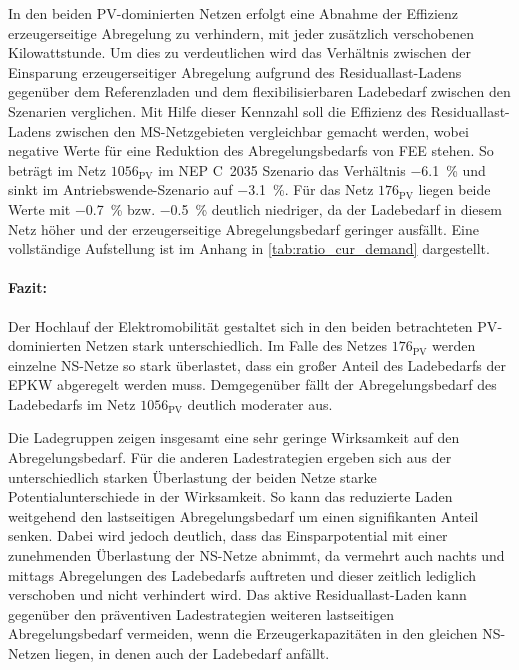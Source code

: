 

In den beiden \gls{PV}-dominierten Netzen erfolgt eine Abnahme der Effizienz erzeugerseitige Abregelung zu verhindern, mit jeder zusätzlich verschobenen Kilowattstunde.
Um dies zu verdeutlichen wird das Verhältnis zwischen der Einsparung erzeugerseitiger Abregelung aufgrund des Residuallast-Ladens gegenüber dem Referenzladen und dem flexibilisierbaren Ladebedarf zwischen den Szenarien verglichen.
Mit Hilfe dieser Kennzahl soll die Effizienz des Residuallast-Ladens zwischen den \gls{MS}-Netzgebieten vergleichbar gemacht werden, wobei negative Werte für eine Reduktion des Abregelungsbedarfs von \gls{FEE} stehen.
So beträgt im Netz \(1056_{\text{PV}}\) im \gls{NEP} C~\num{2035} Szenario das Verhältnis \SI{-6.1}{\percent} und sinkt im Antriebswende-Szenario auf \SI{-3.1}{\percent}.
Für das Netz \(176_{\text{PV}}\) liegen beide Werte mit \SI{-0.7}{\percent} bzw. \SI{-0.5}{\percent} deutlich niedriger, da der Ladebedarf in diesem Netz höher und der erzeugerseitige Abregelungsbedarf geringer ausfällt.
Eine vollständige Aufstellung ist im Anhang in \autoref{tab:ratio_cur_demand} dargestellt.


\paragraph{Fazit:}

Der Hochlauf der Elektromobilität gestaltet sich in den beiden betrachteten \gls{PV}-dominierten Netzen stark unterschiedlich.
Im Falle des Netzes \(176_{\text{PV}}\) werden einzelne \gls{NS}-Netze so stark überlastet, dass ein großer Anteil des Ladebedarfs der \gls{EPKW} abgeregelt werden muss.
Demgegenüber fällt der Abregelungsbedarf des Ladebedarfs im Netz \(1056_{\text{PV}}\) deutlich moderater aus.

Die Ladegruppen zeigen insgesamt eine sehr geringe Wirksamkeit auf den Abregelungsbedarf.
Für die anderen Ladestrategien ergeben sich aus der unterschiedlich starken Überlastung der beiden Netze starke Potentialunterschiede in der Wirksamkeit.
So kann das reduzierte Laden weitgehend den lastseitigen Abregelungsbedarf um einen signifikanten Anteil senken.
Dabei wird jedoch deutlich, dass das Einsparpotential mit einer zunehmenden Überlastung der \gls{NS}-Netze abnimmt, da vermehrt auch nachts und mittags Abregelungen des Ladebedarfs auftreten und dieser zeitlich lediglich verschoben und nicht verhindert wird.
Das aktive Residuallast-Laden kann gegenüber den präventiven Ladestrategien weiteren lastseitigen Abregelungsbedarf vermeiden, wenn die Erzeugerkapazitäten in den gleichen \gls{NS}-Netzen liegen, in denen auch der Ladebedarf anfällt.


